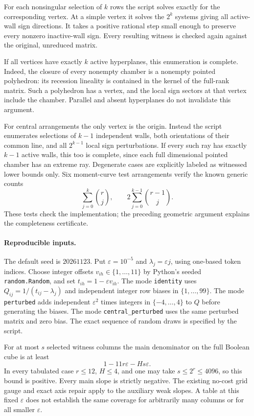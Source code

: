\documentclass[11pt]{article}
\begin{document}
For each nonsingular selection of $k$ rows the script solves exactly for the
corresponding vertex.  At a simple vertex it solves the $2^k$ systems giving
all active-wall sign directions.  It takes a positive rational step small
enough to preserve every nonzero inactive-wall sign.  Every resulting
witness is checked again against the original, unreduced matrix.

If all vertices have exactly $k$ active hyperplanes, this enumeration is
complete.  Indeed, the closure of every nonempty chamber is a nonempty
pointed polyhedron: its recession lineality is contained in the kernel of
the full-rank matrix.  Such a polyhedron has a vertex, and the local sign
sectors at that vertex include the chamber.  Parallel and absent hyperplanes
do not invalidate this argument.

For central arrangements the only vertex is the origin.  Instead the script
enumerates selections of $k-1$ independent walls, both orientations of their
common line, and all $2^{k-1}$ local sign perturbations.  If every such ray
has exactly $k-1$ active walls, this too is complete, since each full
dimensional pointed chamber has an extreme ray.  Degenerate cases are
explicitly labeled as witnessed lower bounds only.  Six moment-curve test
arrangements verify the known generic counts
\[
 \sum_{j=0}^k\binom rj,
 \qquad 2\sum_{j=0}^{k-1}\binom{r-1}j.
\]
These tests check the implementation; the preceding geometric argument
explains the completeness certificate.

\paragraph{Reproducible inputs.}
The default seed is $20261123$.  Put $\varepsilon=10^{-5}$ and
$\lambda_j=\varepsilon j$, using one-based token indices.
Choose integer offsets $v_{ih}\in\{1,\ldots,11\}$ by Python's seeded
\texttt{random.Random}, and set $t_{ih}=1-\varepsilon v_{ih}$.
The mode \texttt{identity} uses
$Q_{ij}=1/(t_{ij}-\lambda_j)$ and independent integer row biases in
$\{1,\ldots,99\}$.  The mode \texttt{perturbed} adds independent
$\varepsilon^2$ times integers in $\{-4,\ldots,4\}$ to $Q$ before generating
the biases.  The mode \texttt{central\_perturbed} uses the same perturbed
matrix and zero bias.  The exact sequence of random draws is specified by
the script.

For at most $s$ selected witness columns the main denominator on the full
Boolean cube is at least
\[
 1-11r\varepsilon-Hs\varepsilon.
\]
In every tabulated case $r\leq12$, $H\leq4$, and one may take
$s\leq2^r\leq4096$, so this bound is positive.  Every main slope is strictly
negative.  The existing no-cost grid gauge and exact axis repair apply to
the auxiliary weak slopes.  A table at this fixed $\varepsilon$ does not
establish the same coverage for arbitrarily many columns or for all smaller
$\varepsilon$.
\end{document}
